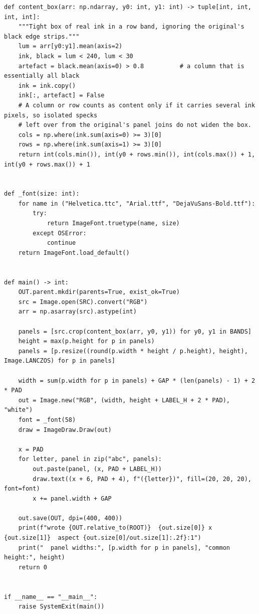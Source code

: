 \documentclass[a4paper,10pt]{article}
\begin{document}
\begin{Verbatim}
def content_box(arr: np.ndarray, y0: int, y1: int) -> tuple[int, int, int, int]:
    """Tight box of real ink in a row band, ignoring the original's black edge strips."""
    lum = arr[y0:y1].mean(axis=2)
    ink, black = lum < 240, lum < 30
    artefact = black.mean(axis=0) > 0.8          # a column that is essentially all black
    ink = ink.copy()
    ink[:, artefact] = False
    # A column or row counts as content only if it carries several ink pixels, so isolated specks
    # left over from the original's panel joins do not widen the box.
    cols = np.where(ink.sum(axis=0) >= 3)[0]
    rows = np.where(ink.sum(axis=1) >= 3)[0]
    return int(cols.min()), int(y0 + rows.min()), int(cols.max()) + 1, int(y0 + rows.max()) + 1


def _font(size: int):
    for name in ("Helvetica.ttc", "Arial.ttf", "DejaVuSans-Bold.ttf"):
        try:
            return ImageFont.truetype(name, size)
        except OSError:
            continue
    return ImageFont.load_default()


def main() -> int:
    OUT.parent.mkdir(parents=True, exist_ok=True)
    src = Image.open(SRC).convert("RGB")
    arr = np.asarray(src).astype(int)

    panels = [src.crop(content_box(arr, y0, y1)) for y0, y1 in BANDS]
    height = max(p.height for p in panels)
    panels = [p.resize((round(p.width * height / p.height), height), Image.LANCZOS) for p in panels]

    width = sum(p.width for p in panels) + GAP * (len(panels) - 1) + 2 * PAD
    out = Image.new("RGB", (width, height + LABEL_H + 2 * PAD), "white")
    font = _font(58)
    draw = ImageDraw.Draw(out)

    x = PAD
    for letter, panel in zip("abc", panels):
        out.paste(panel, (x, PAD + LABEL_H))
        draw.text((x + 6, PAD + 4), f"({letter})", fill=(20, 20, 20), font=font)
        x += panel.width + GAP

    out.save(OUT, dpi=(400, 400))
    print(f"wrote {OUT.relative_to(ROOT)}  {out.size[0]} x {out.size[1]}  aspect {out.size[0]/out.size[1]:.2f}:1")
    print("  panel widths:", [p.width for p in panels], "common height:", height)
    return 0


if __name__ == "__main__":
    raise SystemExit(main())
\end{Verbatim}
\end{document}
